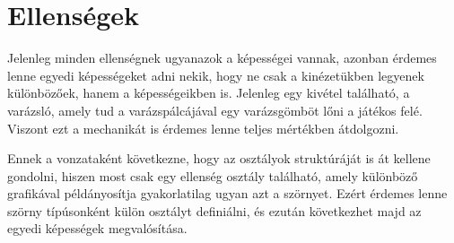 \section{Ellenségek}

\indent \indent Jelenleg minden ellenségnek ugyanazok a képességei vannak, azonban érdemes lenne egyedi képességeket adni nekik, hogy ne csak a kinézetükben legyenek különbözőek, hanem a képességeikben is. Jelenleg egy kivétel található, a varázsló, amely tud a varázspálcájával egy varázsgömböt lőni a játékos felé. Viszont ezt a mechanikát is érdemes lenne teljes mértékben átdolgozni.

Ennek a vonzataként következne, hogy az osztályok struktúráját is át kellene gondolni, hiszen most csak egy ellenség osztály található, amely különböző grafikával példányosítja gyakorlatilag ugyan azt a szörnyet. Ezért érdemes lenne szörny típúsonként külön osztályt definiálni, és ezután következhet majd az egyedi képességek megvalósítása.
